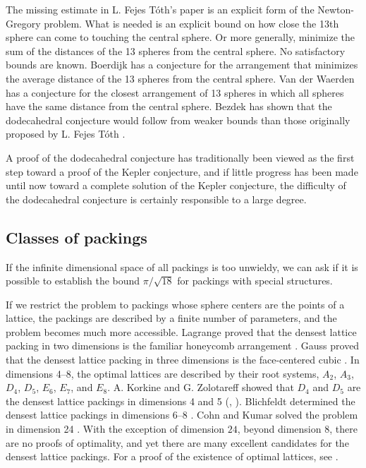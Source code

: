 The missing estimate in L. Fejes T\'oth's paper is an explicit form
of the Newton-Gregory problem.  What is needed is an explicit bound
on how close the 13th sphere can come to touching the central
sphere.  Or more generally, minimize the sum of the distances
of the 13 spheres from the central sphere.
No satisfactory bounds are known.  Boerdijk has a conjecture for the arrangement
that minimizes the average distance of the 13 spheres from the
central sphere.   Van der Waerden
has a conjecture for the closest arrangement of 13 spheres in which
all spheres have the same distance from the central sphere.
Bezdek has shown that the dodecahedral conjecture would follow from
weaker bounds than those originally proposed by L. Fejes T\'oth
\cite{Bez97}.

A proof of the dodecahedral conjecture has traditionally been
viewed as the first step toward a proof of the Kepler conjecture,
and if little progress has been made until now toward a complete
solution of the Kepler conjecture, the difficulty of the dodecahedral
conjecture is certainly responsible to a large degree.

\subsection{Classes of packings}

If the infinite dimensional space of all packings is too unwieldy,
we can ask if it is possible to establish the bound $\pi/\sqrt{18}$
for packings with special structures.

If we restrict the problem
to packings whose sphere centers are the points of a lattice, the
 packings are described by a finite number of parameters, and the
problem becomes much more accessible.  Lagrange proved that the
densest lattice packing in two dimensions is the familiar honeycomb
arrangement \cite{Lag73}. Gauss proved that the densest lattice
packing in three dimensions is the face-centered cubic \cite{Gau31}.
In dimensions 4--8, the optimal lattices are described by their root
systems, $A_2$, $A_3$, $D_4$, $D_5$, $E_6$, $E_7$, and $E_8$. A.
Korkine and G. Zolotareff showed that $D_4$ and $D_5$ are the
densest lattice packings in dimensions 4 and 5 (\cite{KoZ73},
\cite{KoZ77}). Blichfeldt determined the densest lattice packings in
dimensions 6--8 \cite{Bli35}. Cohn and Kumar solved the problem in
dimension 24 \cite{CoKu}.  With the exception of dimension $24$,
beyond dimension $8$, there are no proofs of optimality, and yet
there are many excellent candidates for the densest lattice
packings.  For a proof of the existence of optimal lattices, see
\cite{Oes90}.


